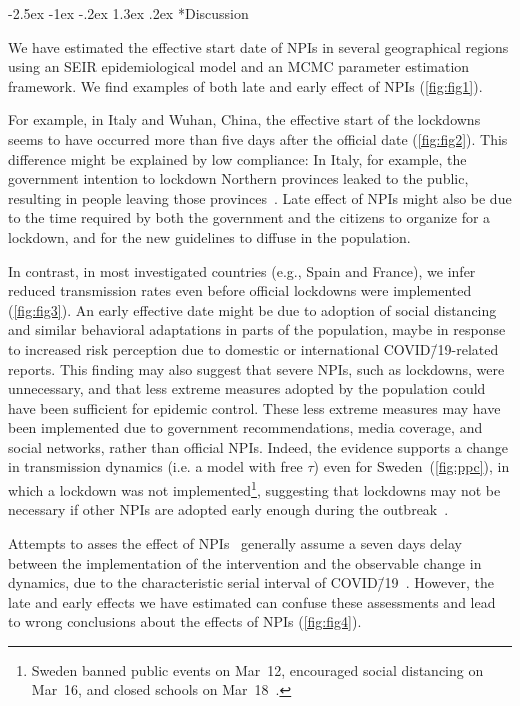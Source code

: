 \documentclass[12pt]{extarticle}
\makeatletter
\renewcommand\section{\@startsection {section}{1}{\z@}%
     {-2.5ex \@plus -1ex \@minus -.2ex}%
     {1.3ex \@plus.2ex}%
    {\Large\bfseries}}
\makeatother
\begin{document}
\pagebreak
\section*{Discussion}

We have estimated the effective start date of NPIs in several geographical regions using an SEIR epidemiological model and an MCMC parameter estimation framework.
We find examples of both late and early effect of NPIs (\autoref{fig:fig1}).

For example, in Italy and Wuhan, China, the effective start of the lockdowns seems to have occurred more than five days after the official date (\autoref{fig:fig2}).
This difference might be explained by low compliance: In Italy, for example, the government intention to lockdown Northern provinces leaked to the public, resulting in people leaving those provinces~\citep{Gatto2020}.
Late effect of NPIs might also be due to the time required by both the government and the citizens to organize for a lockdown, and for the new guidelines to diffuse in the population.
 
In contrast, in most investigated countries (e.g., Spain and France), we infer reduced transmission rates even before official lockdowns were implemented (\autoref{fig:fig3}).
An early effective date might be due to adoption of social distancing and similar behavioral adaptations in parts of the population, maybe in response to increased risk perception due to domestic or international COVID\=/19-related reports.
This finding may also suggest that severe NPIs, such as lockdowns, were unnecessary, and that less extreme measures adopted by the population could have been sufficient for epidemic control.
These less extreme measures may have been implemented due to government recommendations, media coverage, and social networks, rather than official NPIs.
Indeed, the evidence supports a change in transmission dynamics (i.e. a model with free $\tau$) even for Sweden~(\autoref{fig:ppc}), in which a lockdown was not implemented\footnote{Sweden banned public events on Mar~12, encouraged social distancing on Mar~16, and closed schools on Mar~18~\citep{Flaxman2020}.}, suggesting that lockdowns may not be necessary if other NPIs are adopted early enough during the outbreak~\citep{Banholzer2020}.

Attempts to asses the effect of NPIs~\citep{Flaxman2020,Banholzer2020} generally assume a seven days delay between the implementation of the intervention and the observable change in dynamics, due to the characteristic serial interval of COVID\=/19~\citep{Gatto2020}.
However, the late and early effects we have estimated can confuse these assessments and lead to wrong conclusions about the effects of NPIs (\autoref{fig:fig4}).
\end{document}
